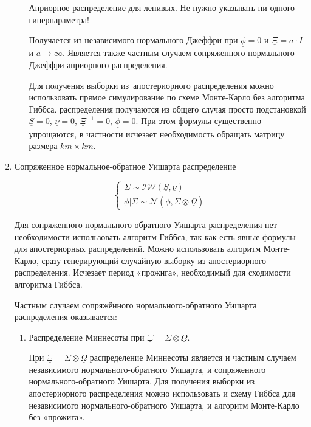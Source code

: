 \documentclass[11pt]{article} %
\newcommand{\cN}{\mathcal{N}}
\newcommand{\cIW}{\mathcal{IW}}
\newcommand{\prior}{\underline}
\begin{document}
\begin{enumerate}
\begin{enumerate}
\begin{enumerate}
\end{enumerate}


Априорное распределение для ленивых. Не нужно указывать ни одного
гиперпараметра!


Получается из независимого нормального-Джеффри при $\prior\phi=0$ и
$\prior\Xi= a\cdot I$ и $a\to \infty$. Является также частным случаем
сопряженного нормального-Джеффри априорного распределения.


Для получения выборки из~апостериорного распределения можно
использовать прямое симулирование по схеме Монте-Карло без алгоритма
Гиббса. %
распределения получаются из общего случая просто подстановкой $\prior
S=0$, $\prior \nu =0$, $\prior \Xi^{-1}=0$, $\prior\phi=0$. При этом
формулы существенно упрощаются, в частности исчезает необходимость
обращать матрицу размера $km\times km$.


\end{enumerate}

\item Сопряженное нормальное-обратное Уишарта распределение


\begin{equation}
\begin{cases}
\Sigma\sim \cIW(\prior S, \prior \nu) \\
\phi|\Sigma\sim \cN (\prior \phi, \Sigma\otimes\prior \Omega)
\end{cases}
\end{equation}


Для сопряженного нормального-обратного Уишарта распределения нет
необходимости использовать алгоритм Гиббса, так как есть явные формулы
для апостериорных распределений. Можно использовать алгоритм
Монте-Карло, сразу генерирующий случайную выборку из апостериорного
распределения. Исчезает период «прожига», необходимый для сходимости
алгоритма Гиббса.


Частным случаем сопряжённого нормального-обратного Уишарта
распределения оказывается:


\begin{enumerate}

\item Распределение Миннесоты при  $\prior \Xi =  \Sigma \otimes
\prior \Omega $.



При $\prior \Xi =  \Sigma \otimes \prior \Omega $ распределение
Миннесоты является и частным случаем независимого
нормального-обратного Уишарта, и сопряженного нормального-обратного
Уишарта. Для получения выборки из апостериорного распределения можно
использовать и схему Гиббса для независимого нормального-обратного
Уишарта, и алгоритм Монте-Карло без «прожига».




\end{enumerate}
\end{enumerate}
\end{document}
